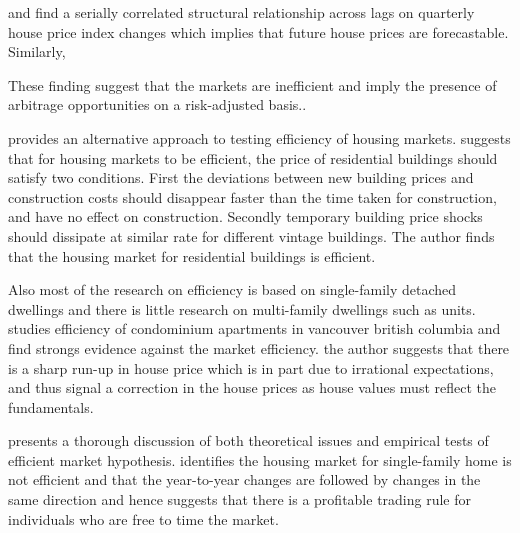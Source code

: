\documentclass[AEJ,reqno, draftmode]{AEA}
\begin{document}

\citet{Case1989125} and \citet{hosios1991measuring} find a serially correlated structural relationship across lags on quarterly house price index changes which implies that future house prices are forecastable. Similarly, 

These finding suggest that the markets are inefficient and imply the presence of arbitrage opportunities on a risk-adjusted basis..


\citet{rosenthal1999residential} provides an alternative approach to testing efficiency of housing markets. \citet{rosenthal1999residential} suggests that for housing markets to be efficient, the price of residential buildings should satisfy two conditions. First the deviations between new building prices and construction costs should disappear faster than the time taken for construction, and have no effect on construction. Secondly temporary building price shocks should dissipate at similar rate for different vintage buildings. The author finds that the housing market for residential buildings is efficient.


Also most of the research on efficiency is based on single-family detached dwellings and there is little research on multi-family dwellings such as units. \citet{clayton1998further} studies efficiency of condominium apartments in vancouver british columbia and find strongs evidence against the market efficiency. the author suggests that there is a sharp run-up in house price which is in part due to irrational expectations, and thus signal a correction in the house prices as house values must reflect the fundamentals.











  \citep{Fama1970EfficientWork} presents a thorough discussion of both theoretical issues and empirical tests of efficient market hypothesis.  \citet{Case1989125} identifies the housing market for single-family home is not efficient and that the year-to-year changes are followed by changes in the same direction and hence suggests that there is a profitable trading rule for individuals who are free to time the market.
\end{document}
